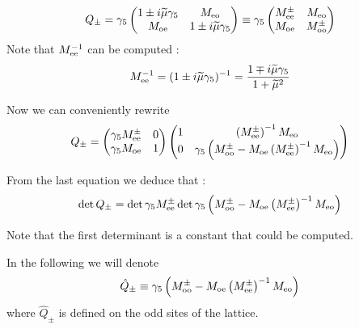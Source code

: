 \documentclass{article}[12pt]
\begin{document}
\begin{equation}
Q_{\pm}= \gamma_5 \begin{pmatrix} 
1 \pm i \widetilde{\mu} \gamma_5 & M_{\rm{eo}} \\
M_{\rm{oe}} & 1 \pm i \widetilde{\mu} \gamma_5\\
\end{pmatrix} \equiv \gamma_5 \begin{pmatrix} 
M^{\pm}_{\rm{ee}}  & M_{\rm{eo}} \\
M_{\rm{oe}} & M^{\pm}_{\rm{oo}}\\
\end{pmatrix}
\end{equation}
Note that $M_{\rm{ee}}^{-1}$ can be computed : 
\begin{equation}
M_{\rm{ee}}^{-1} = ( 1 \pm i\widetilde{\mu} \gamma_5)^{-1} = \frac{1\mp
i \widetilde{\mu}\gamma_5 }{ 1 + \widetilde{\mu}^2}
\end{equation}


Now we can conveniently rewrite 
\begin{equation}
Q_{\pm} =  \begin{pmatrix} 
\gamma_5 M^{\pm}_{\rm{ee}}  & 0 \\ \gamma_5 M_{\rm{oe}} & 1\\
\end{pmatrix} \begin{pmatrix} 
1  &  \left(M^{\pm}_{\rm{ee}}\right)^{-1} M_{\rm{eo}} \\0 & \gamma_5
  \left(M^{\pm}_{\rm{oo}} - M_{\rm{oe}}
    \left(M^{\pm}_{\rm{ee}}\right)^{-1} M_{\rm{eo}} \right)\\
\end{pmatrix} 
\end{equation}


From the last equation we deduce that :
\begin{equation}
\det{Q_{\pm}} = \det{\gamma_5 M^{\pm}_{\rm{ee}} } \det{\gamma_5
  \left(M^{\pm}_{\rm{oo}} - M_{\rm{oe}}
    \left(M^{\pm}_{\rm{ee}}\right)^{-1} M_{\rm{eo}} \right)}
\end{equation}

Note that the first determinant is a constant that could be computed.

In the following we will denote 
\begin{equation}
\hat{Q}_{\pm} \equiv \gamma_5
  \left(M^{\pm}_{\rm{oo}} - M_{\rm{oe}}
    \left(M^{\pm}_{\rm{ee}}\right)^{-1} M_{\rm{eo}} \right)
\end{equation}
where $\hat{Q}_{\pm}$ is defined on the odd sites of the lattice. 
\end{document}
